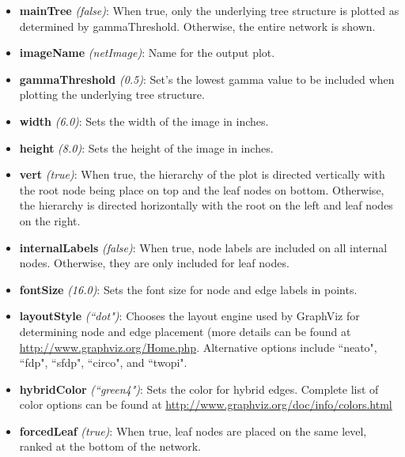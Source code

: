 \documentclass[12pt]{article}
\begin{document}
\begin{itemize}
\item \textbf{mainTree} \textit{(false)}: When true, only the underlying tree structure is plotted as determined by gammaThreshold. Otherwise, the entire network is shown.

\item \textbf{imageName} \textit{(netImage)}: Name for the output plot.

\item \textbf{gammaThreshold} \textit{(0.5)}: Set's the lowest gamma value to be included when plotting the underlying tree structure.

\item \textbf{width} \textit{(6.0)}: Sets the width of the image in inches.

\item \textbf{height} \textit{(8.0)}: Sets the height of the image in inches.

\item \textbf{vert} \textit{(true)}: When true, the hierarchy of the plot is directed vertically with the root node being place on top and the leaf nodes on bottom.
  Otherwise, the hierarchy is directed horizontally with the root on the left and leaf nodes on the right.

\item \textbf{internalLabels} \textit{(false)}: When true, node labels are included on all internal nodes. Otherwise, they are only included for leaf nodes.

\item \textbf{fontSize} \textit{(16.0)}: Sets the font size for node and edge labels in points.

\item \textbf{layoutStyle} \textit{(``dot")}: Chooses the layout engine used by GraphViz for determining node and edge placement (more details can be found at \url{http://www.graphviz.org/Home.php}.	        							 	     Alternative options include ``neato", ``fdp", ``sfdp", ``circo", and ``twopi".

\item \textbf{hybridColor} \textit{(``green4")}: Sets the color for hybrid edges. Complete list of color options can be found at \url{http://www.graphviz.org/doc/info/colors.html}

\item \textbf{forcedLeaf} \textit{(true)}: When true, leaf nodes are placed on the same level, ranked at the bottom of the network.


\end{itemize}
\end{document}
